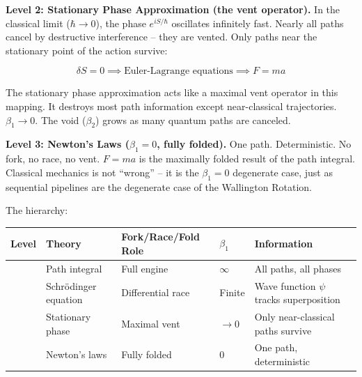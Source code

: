 \documentclass[
  11pt,
]{article}
\newcounter{none} %
\begin{document}
\textbf{Level 2: Stationary Phase Approximation (the vent operator).} In
the classical limit (\(\hbar \to 0\)), the phase \(e^{iS/\hbar}\)
oscillates infinitely fast. Nearly all paths cancel by destructive
interference -- they are vented. Only paths near the stationary point of
the action survive:

\[
\delta S = 0 \implies \text{Euler-Lagrange equations} \implies F = ma
\]

The stationary phase approximation acts like a maximal vent operator in
this mapping. It destroys most path information except near-classical
trajectories. \(\beta_1 \to 0\). The void (\(\beta_2\)) grows as many
quantum paths are canceled.

\textbf{Level 3: Newton's Laws (\(\beta_1 = 0\), fully folded).} One
path. Deterministic. No fork, no race, no vent. \(F = ma\) is the
maximally folded result of the path integral. Classical mechanics is not
``wrong'' -- it is the \(\beta_1 = 0\) degenerate case, just as
sequential pipelines are the degenerate case of the Wallington Rotation.

The hierarchy:

{\def\LTcaptype{none} %
\begin{longtable}[]{@{}
  >{\raggedright\arraybackslash}p{}
  >{\raggedright\arraybackslash}p{}
  >{\raggedright\arraybackslash}p{}
  >{\raggedright\arraybackslash}p{}
  >{\raggedright\arraybackslash}p{}@{}}
\toprule\noalign{}
\begin{minipage}[b]{\linewidth}\raggedright
Level
\end{minipage} & \begin{minipage}[b]{\linewidth}\raggedright
Theory
\end{minipage} & \begin{minipage}[b]{\linewidth}\raggedright
Fork/Race/Fold Role
\end{minipage} & \begin{minipage}[b]{\linewidth}\raggedright
\(\beta_1\)
\end{minipage} & \begin{minipage}[b]{\linewidth}\raggedright
Information
\end{minipage} \\
\midrule\noalign{}
\endhead
\bottomrule\noalign{}
\endlastfoot
1 & Path integral & Full engine & \(\infty\) & All paths, all phases \\
2 & Schrödinger equation & Differential race & Finite & Wave function
\(\psi\) tracks superposition \\
3 & Stationary phase & Maximal vent & \(\to 0\) & Only near-classical
paths survive \\
4 & Newton's laws & Fully folded & \(0\) & One path, deterministic \\
\end{longtable}
}
\end{document}
